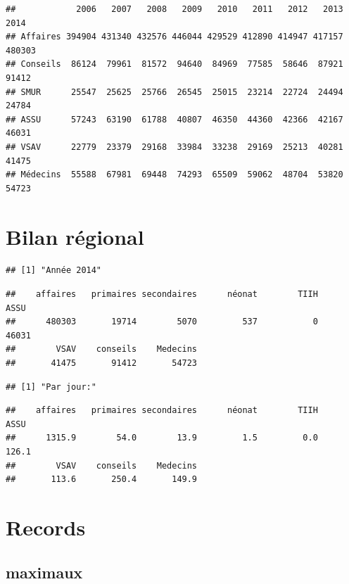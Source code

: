 \documentclass[]{article}
\newenvironment{Shaded}{\begin{snugshade}}{\end{snugshade}}
\newcommand{\KeywordTok}[1]{\textcolor[rgb]{0.13,0.29,0.53}{\textbf{{#1}}}}
\newcommand{\DataTypeTok}[1]{\textcolor[rgb]{0.13,0.29,0.53}{{#1}}}
\newcommand{\StringTok}[1]{\textcolor[rgb]{0.31,0.60,0.02}{{#1}}}
\newcommand{\NormalTok}[1]{{#1}}
\begin{document}
\begin{verbatim}
##            2006   2007   2008   2009   2010   2011   2012   2013   2014
## Affaires 394904 431340 432576 446044 429529 412890 414947 417157 480303
## Conseils  86124  79961  81572  94640  84969  77585  58646  87921  91412
## SMUR      25547  25625  25766  26545  25015  23214  22724  24494  24784
## ASSU      57243  63190  61788  40807  46350  44360  42366  42167  46031
## VSAV      22779  23379  29168  33984  33238  29169  25213  40281  41475
## Médecins  55588  67981  69448  74293  65509  59062  48704  53820  54723
\end{verbatim}

\section{Bilan régional}\label{bilan-regional}

\begin{verbatim}
## [1] "Année 2014"
\end{verbatim}

\begin{verbatim}
##    affaires   primaires secondaires      néonat        TIIH        ASSU 
##      480303       19714        5070         537           0       46031 
##        VSAV    conseils    Medecins 
##       41475       91412       54723
\end{verbatim}

\begin{verbatim}
## [1] "Par jour:"
\end{verbatim}

\begin{verbatim}
##    affaires   primaires secondaires      néonat        TIIH        ASSU 
##      1315.9        54.0        13.9         1.5         0.0       126.1 
##        VSAV    conseils    Medecins 
##       113.6       250.4       149.9
\end{verbatim}

\section{Records}\label{records}

\subsection{maximaux}\label{maximaux}

\begin{Shaded}
\end{Shaded}
\end{document}

